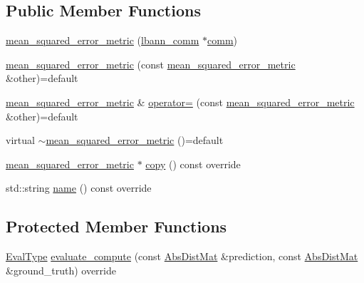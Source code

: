 \subsection*{Public Member Functions}
\begin{DoxyCompactItemize}
\item 
\hyperlink{classlbann_1_1mean__squared__error__metric_ae8a430d4cb0b350606839ea7b9eda69d}{mean\+\_\+squared\+\_\+error\+\_\+metric} (\hyperlink{classlbann_1_1lbann__comm}{lbann\+\_\+comm} $\ast$\hyperlink{file__io_8cpp_ab048c6f9fcbcfaa57ce68b00263dbebe}{comm})
\item 
\hyperlink{classlbann_1_1mean__squared__error__metric_a9230a3b901252e95a58f4bea98861bd7}{mean\+\_\+squared\+\_\+error\+\_\+metric} (const \hyperlink{classlbann_1_1mean__squared__error__metric}{mean\+\_\+squared\+\_\+error\+\_\+metric} \&other)=default
\item 
\hyperlink{classlbann_1_1mean__squared__error__metric}{mean\+\_\+squared\+\_\+error\+\_\+metric} \& \hyperlink{classlbann_1_1mean__squared__error__metric_acea91914634adf15d9f4b7978ca2ff51}{operator=} (const \hyperlink{classlbann_1_1mean__squared__error__metric}{mean\+\_\+squared\+\_\+error\+\_\+metric} \&other)=default
\item 
virtual \hyperlink{classlbann_1_1mean__squared__error__metric_a85c8dd7d1bf0b34160ca529c507ebca3}{$\sim$mean\+\_\+squared\+\_\+error\+\_\+metric} ()=default
\item 
\hyperlink{classlbann_1_1mean__squared__error__metric}{mean\+\_\+squared\+\_\+error\+\_\+metric} $\ast$ \hyperlink{classlbann_1_1mean__squared__error__metric_a4caa0dfc86361a1c9a91fb64efecfcc9}{copy} () const override
\item 
std\+::string \hyperlink{classlbann_1_1mean__squared__error__metric_ac5477e6104eaf87fbbe2a13232ee2d9f}{name} () const override
\end{DoxyCompactItemize}
\subsection*{Protected Member Functions}
\begin{DoxyCompactItemize}
\item 
\hyperlink{base_8hpp_a3266f5ac18504bbadea983c109566867}{Eval\+Type} \hyperlink{classlbann_1_1mean__squared__error__metric_a81a2aa469f965d526a489214b3e73e4f}{evaluate\+\_\+compute} (const \hyperlink{base_8hpp_a9a697a504ae84010e7439ffec862b470}{Abs\+Dist\+Mat} \&prediction, const \hyperlink{base_8hpp_a9a697a504ae84010e7439ffec862b470}{Abs\+Dist\+Mat} \&ground\+\_\+truth) override
\end{DoxyCompactItemize}


